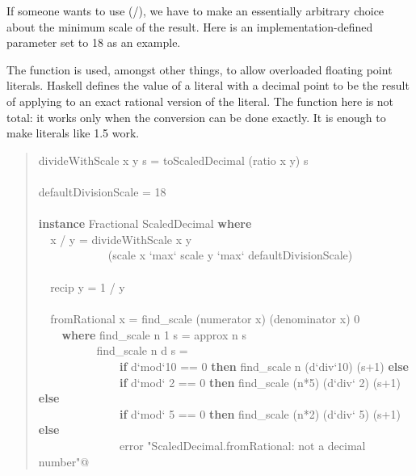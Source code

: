 \documentclass[prodmode,acmtoplas]{acmsmall}
\begin{document}
If someone wants to use (/), we have to make an essentially arbitrary
choice about the minimum scale of the result.  Here
 is an implementation-defined parameter
set to 18 as an example.

The  function is used, amongst other things,
to allow overloaded floating point literals.  Haskell defines the
value of a literal with a decimal point to be the result of applying
 to an exact rational version of the literal.
The function here is not total: it works only when the conversion can
be done exactly.  It is enough to make literals like 1.5 work.


\begin{quote}
\begin{tabbing}
\sffamily divideWithScale x y s = toScaledDecimal (ratio x y) s\\
\\
\sffamily defaultDivisionScale = 18\\
\\
\sffamily \textbf{instance} Fractional ScaledDecimal \textbf{where}\\
\verb|  |\sffamily  x / y = divideWithScale x y\\
\verb|            |\sffamily            (scale x `max` scale y `max` defaultDivisionScale)\\
\\
\verb|  |\sffamily  recip y = 1 / y\\
\\
\verb|  |\sffamily  fromRational x = find\_scale (numerator x) (denominator x) 0\\
\verb|    |\sffamily    \textbf{where} find\_scale n 1 s = approx n s\\
\verb|          |\sffamily          find\_scale n d s =\\
\verb|              |\sffamily              \textbf{if} d`mod`10 == 0 \textbf{then} find\_scale n     (d`div`10) (s+1) \textbf{else}\\
\verb|              |\sffamily              \textbf{if} d`mod` 2 == 0 \textbf{then} find\_scale (n*5) (d`div` 2) (s+1) \textbf{else}\\
\verb|              |\sffamily              \textbf{if} d`mod` 5 == 0 \textbf{then} find\_scale (n*2) (d`div` 5) (s+1) \textbf{else}\\
\verb|              |\sffamily              error \verb@"ScaledDecimal.fromRational: not a decimal number"@
\end{tabbing}
\end{quote}
\end{document}
